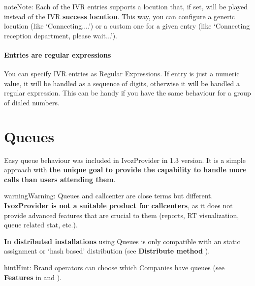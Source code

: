 \documentclass[letterpaper,10pt,english]{sphinxmanual}
\begin{document}
\begin{notice}{note}{Note:}
Each of the IVR entries supports a locution that, if set,
will be played instead of the IVR \textbf{success locution}. This way, you can
configure a generic locution (like `Connecting....') or a custom one for
a given entry (like `Connecting reception department, please wait...').
\end{notice}
\paragraph{Entries are regular expressions}

You can specify IVR entries as Regular Expressions. If entry is just
a numeric value, it will be handled as a sequence of digits, otherwise it
will be handled a regular expression. This can be handy if you have the
same behaviour for a group of dialed numbers.


\section{Queues}
\label{company/queues:queues}\label{company/queues::doc}
Easy queue behaviour was included in IvozProvider in 1.3 version. It is a simple
approach with \textbf{the unique goal to provide the capability to handle more calls
than users attending them}.

\begin{notice}{warning}{Warning:}
Queues and callcenter are close terms but different. \textbf{IvozProvider
is not a suitable product for callcenters}, as it does not provide
advanced features that are crucial to them (reports, RT visualization,
queue related stat, etc.).
\end{notice}

\textbf{In distributed installations} using Queues is only compatible with an static
assignment or `hash based' distribution (see \textbf{Distribute method} {\hyperref[brand/virtual_pbx:virtual\string-pbx]{}}).

\begin{notice}{hint}{Hint:}
Brand operators can choose which Companies have queues (see \textbf{Features}
in {\hyperref[brand/index:brand\string-configuration]{}} and {\hyperref[company/index:company\string-configuration]{}}).
\end{notice}
\end{document}
